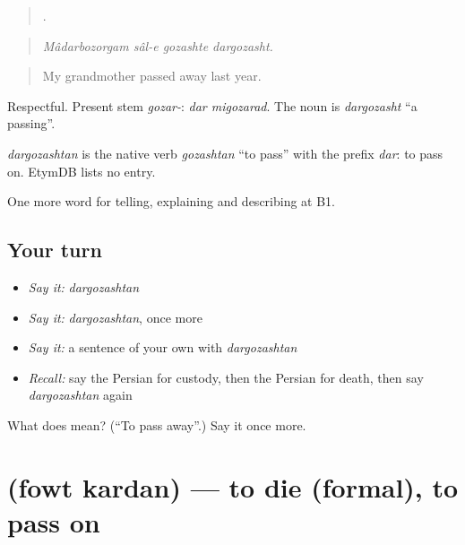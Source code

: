 \begin{quote}
   .
\end{quote}

\begin{quote}
\emph{Mâdarbozorgam sâl-e gozashte dargozasht.}
\end{quote}

\begin{quote}
My grandmother passed away last year.
\end{quote}

Respectful. Present stem \emph{gozar-}: \emph{dar migozarad}. The noun is \emph{dargozasht} \textquotedblleft{}a passing\textquotedblright{}.

\begin{cousinweb}
\emph{dargozashtan} is the native verb \emph{gozashtan} \textquotedblleft{}to pass\textquotedblright{} with the prefix \emph{dar}: to pass on. EtymDB lists no entry.
\end{cousinweb}

\begin{grammarlens}[title={What you've built}]
One more word for telling, explaining and describing at B1.
\end{grammarlens}

\subsection*{Your turn}
\begin{itemize}
\raggedright
  \item \emph{Say it:} \emph{dargozashtan}
  \item \emph{Say it:} \emph{dargozashtan}, once more
  \item \emph{Say it:} a sentence of your own with \emph{dargozashtan}
  \item \emph{Recall:} say the Persian for custody, then the Persian for death, then say \emph{dargozashtan} again
\end{itemize}

\begin{tcolorbox}[breakable,colback=teal!4,colframe=teal!35!black,title={Before you move on}]
What does  mean? (\textquotedblleft{}To pass away\textquotedblright{}.) Say it once more.
\end{tcolorbox}
\section[\texorpdfstring{\fa{فوت} \fa{کردن} (fowt kardan)}{فوت کردن (fowt kardan)}]{  (fowt kardan) — to die (formal), to pass on}

